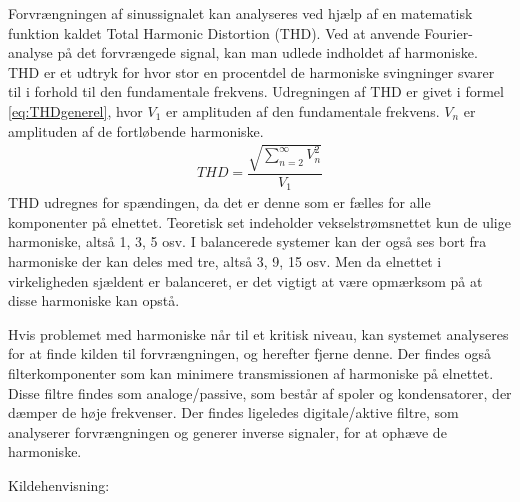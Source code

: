 Forvrængningen af sinussignalet kan analyseres ved hjælp af en matematisk funktion kaldet Total Harmonic Distortion (THD). Ved at anvende Fourier-analyse på det forvrængede signal, kan man udlede indholdet af harmoniske. THD er et udtryk for hvor stor en procentdel de harmoniske svingninger svarer til i forhold til den fundamentale frekvens. Udregningen af THD er givet i formel \ref{eq:THDgenerel}, hvor $V_1$ er amplituden af den fundamentale frekvens. $V_n$ er amplituden af de fortløbende harmoniske. 
\begin{align}
THD = \dfrac{\sqrt{\sum_{n=2}^{\infty}V_n^{2}}}{V_{1}}
\label{eq:THDgenerel}
\end{align}
THD udregnes for spændingen, da det er denne som er fælles for alle komponenter på elnettet. Teoretisk set indeholder vekselstrømsnettet kun de ulige harmoniske, altså 1, 3, 5 osv. I balancerede systemer kan der også ses bort fra harmoniske der kan deles med tre, altså 3, 9, 15 osv. Men da elnettet i virkeligheden sjældent er balanceret, er det vigtigt at være opmærksom på at disse harmoniske kan opstå. \newline

Hvis problemet med harmoniske når til et kritisk niveau, kan systemet analyseres for at finde kilden til forvrængningen, og herefter fjerne denne. Der findes også filterkomponenter som kan minimere transmissionen af harmoniske på elnettet. Disse filtre findes som analoge/passive, som består af spoler og kondensatorer, der dæmper de høje frekvenser. Der findes ligeledes digitale/aktive filtre, som analyserer forvrængningen og generer inverse signaler, for at ophæve de harmoniske.\cite{HarmoniskeFiltre}\newline


Kildehenvisning: \cite{HarmoniskeVideo}
 

